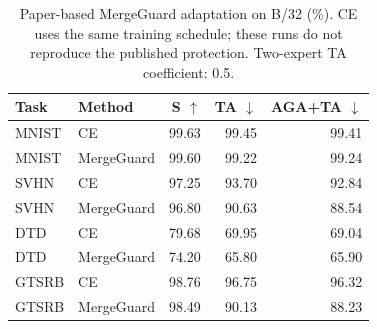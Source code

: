 \begin{table}[!htbp]
\centering
\small
\setlength{\tabcolsep}{3pt}
\caption{Paper-based MergeGuard adaptation on B/32 (\%). CE uses the same training schedule; these runs do not reproduce the published protection. Two-expert TA coefficient: 0.5.}
\label{tab:mergeguard-adaptation}
\begin{tabular}{llrrr}
\toprule
Task & Method & S $\uparrow$ & TA $\downarrow$ & AGA+TA $\downarrow$ \\
\midrule
MNIST & CE & 99.63 & 99.45 & 99.41 \\
MNIST & MergeGuard & 99.60 & 99.22 & 99.24 \\
SVHN & CE & 97.25 & 93.70 & 92.84 \\
SVHN & MergeGuard & 96.80 & 90.63 & 88.54 \\
DTD & CE & 79.68 & 69.95 & 69.04 \\
DTD & MergeGuard & 74.20 & 65.80 & 65.90 \\
GTSRB & CE & 98.76 & 96.75 & 96.32 \\
GTSRB & MergeGuard & 98.49 & 90.13 & 88.23 \\
\bottomrule
\end{tabular}
\end{table}
